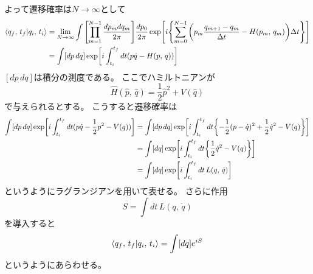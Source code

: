 \documentclass[../../master.tex]{subfiles}
\begin{document}
よって遷移確率は\(N\rightarrow \infty\)として
\begin{align}
    \braket{q_f,\,t_f}{q_i,\,t_i}
    &= \lim_{N\rightarrow \infty} \int \qty[\prod_{m=1}^{N-1}\frac{dp_m dq_m}{2\pi}]\frac{dp_0}{2\pi}
    \exp[i\qty{\sum_{m=0}^{N-1}\qty(p_m\frac{q_{m+1}-q_m}{\Delta t}-H(p_m,\,q_m))\Delta t}]\notag\\
    &=\int [dp\,dq] \exp[i\int_{t_i}^{t_f} dt(p\dot{q}-H(p,\,q))]
\end{align}
\([dp\,dq]\)は積分の測度である。
ここでハミルトニアンが
\begin{equation}
    \hat{H}(\hat{p},\,\hat{q}) = \frac{1}{2}\hat{p}^2 + V(\hat{q})
\end{equation}
で与えられるとする。
こうすると遷移確率は
\begin{align}
    \int [dp\,dq] \exp[i\int_{t_i}^{t_f} dt(p\dot{q}-\frac{1}{2}p^2 - V(q))]
    &=\int [dp\,dq] \exp[i\int_{t_i}^{t_f} dt\qty{-\frac{1}{2}(p-\dot{q})^2 + \frac{1}{2}\dot{q}^2 - V(q)}]\notag\\
    &=\int [dq] \exp[i\int_{t_i}^{t_f} dt\qty{\frac{1}{2}\dot{q}^2 - V(q)}]\notag\\
    &=\int [dq] \exp[i\int_{t_i}^{t_f} dt\, L(q,\,\dot{q})]
\end{align}
というようにラグランジアンを用いて表せる。
さらに作用
\begin{equation}
    S = \int dt\, L(q,\,\dot{q})
\end{equation}
を導入すると
\begin{equation*}
    \braket{q_f,\,t_f}{q_i,\,t_i} = \int [dq]e^{iS}
\end{equation*}
というようにあらわせる。
\end{document}
